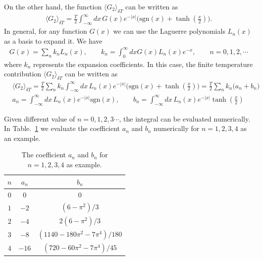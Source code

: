 \documentclass[sn-mathphys,Numbered]{sn-jnl}
\begin{document}
On the other hand, the function $\langle G_2\rangle_{\delta T}$ can be written as 
\begin{align}
\langle G_2\rangle_{\delta T}=\frac{T}{2}\int^{\infty}_{-\infty}\!\!dx\,G(x) e^{-|x|}\bigg(\mathrm{sgn}\left(x\right)+\tanh\left(\frac{x}{2}\right)\bigg).
\end{align}
In general, for any function $G(x)$ we can use the Laguerre polynomials $L_n(x)$ as a basis to expand it. We have
\begin{align}
G(x)=\sum_{n}k_nL_n(x),\qquad k_n=\int_0^\infty\!\!dx G(x)L_n(x)e^{-x},\qquad n=0,1,2,\cdots
\end{align}
where $k_n$ represents the expansion coefficients. In this case, the finite temperature contribution $\langle G_2\rangle_{\delta T}$ can be written as
\begin{align}
&\langle G_2\rangle_{\delta T}\!=\!\frac{T}{2}\sum_n k_n\!\!\int^{\infty}_{-\infty}\!\!\!\!dx\,L_n(x) e^{-|x|}\bigg(\mathrm{sgn}\left(x\right)+\tanh\left(\frac{x}{2}\right)\!\!\bigg)\!\!=\frac{T}{2}\sum_n k_n\bigg(a_n+b_n\bigg)\\
&a_n=\int^{\infty}_{-\infty}\!\!\!\!dx\,L_n(x) e^{-|x|}\mathrm{sgn}\left(x\right),\qquad b_n=\int^{\infty}_{-\infty}\!\!\!\!dx\,L_n(x) e^{-|x|}\tanh\left(\frac{x}{2}\right)
\end{align}

Given different value of $n=0,1,2,3\cdots$, the integral can be evaluated numerically. In Table.~\ref{coeff_table} we evaluate the coefficient $a_n$ and $b_n$ numerically for $n=1,2,3,4$ as an example.  %
\begin{table}%
\centering
\begin{tabular}{c| c| c}
\hline\hline
$n$ &$a_n$ & $b_n$ \\
\hline
$0$ & $0$ & $0$\\ 
\hline
$1$ & $-2$ & $(6-\pi^2)/3$\\
\hline
$2$ & $-4$& $2(6-\pi^2)/3$\\
\hline
 $3$ & $-8$&$(1140-180\pi^2-7\pi^4)/180$\\
\hline
$4$ & $-16$ & $(720-60\pi^2-7\pi^4)/45$\\
\hline\hline
\end{tabular}
\caption{The coefficient $a_n$ and $b_n$ for $n=1,2,3,4$ as example.}
\label{coeff_table} 
\end{table}
\end{document}
